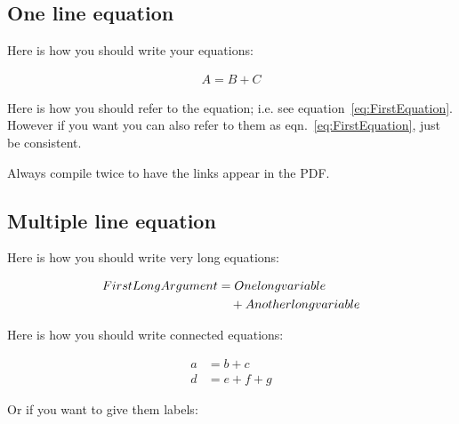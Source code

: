 \subsection{One line equation}

Here is how you should write your equations:

\begin{align}
A=B+C
\label{eq:FirstEquation}
\end{align}

Here is how you should refer to the equation; i.e. see equation~\ref{eq:FirstEquation}. However if you want you can also refer to them as
eqn.~\eqref{eq:FirstEquation}, just be consistent.

Always compile twice to have the links appear in the PDF.

\subsection{Multiple line equation}

Here is how you should write very long equations:

\begin{align}
First Long Argument &=	 One long variable
\notag \\
					&\quad + Another long variable
\label{eqn:LongEquation}
\end{align}

Here is how you should write connected equations:

\begin{subequations}
\label{eq:MultipleEquations}
\begin{align}
a &= b+c
\\
d &= e+f+g
\end{align}
\end{subequations}

Or if you want to give them labels:

